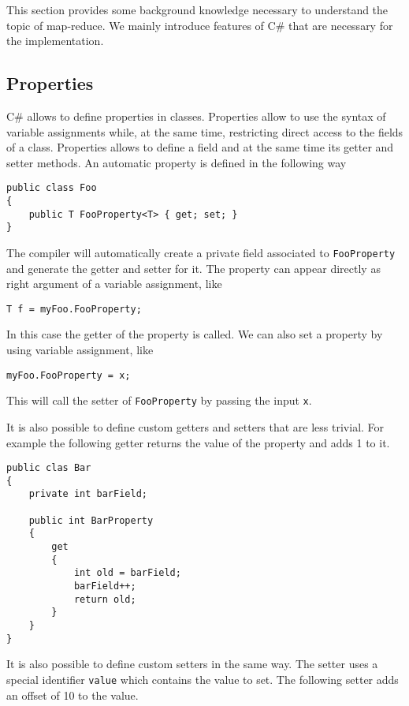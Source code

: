 This section provides some background knowledge necessary to understand the topic of map-reduce. We mainly introduce features of C\# that are necessary for the implementation.

\subsection{Properties}
C\# allows to define properties in classes. Properties allow to use the syntax of variable assignments while, at the same time, restricting direct access to the fields of a class. Properties allows to define a field and at the same time its getter and setter methods. An automatic property is defined in the following way

\begin{lstlisting}
public class Foo
{
	public T FooProperty<T> { get; set; }
}
\end{lstlisting}

\noindent
The compiler will automatically create a private field associated to \texttt{FooProperty} and generate the getter and setter for it. The property can appear directly as right argument of a variable assignment, like

\begin{lstlisting}
T f = myFoo.FooProperty;
\end{lstlisting}

\noindent
In this case the getter of the property is called. We can also set a property by using variable assignment, like

\begin{lstlisting}
myFoo.FooProperty = x;
\end{lstlisting}

\noindent
This will call the setter of \texttt{FooProperty} by passing the input \texttt{x}.

It is also possible to define custom getters and setters that are less trivial. For example the following getter returns the value of the property and adds 1 to it.

\begin{lstlisting}
public clas Bar
{
	private int barField;
	
	public int BarProperty
	{
		get
		{
			int old = barField;
			barField++;
			return old;
		}
	}
}
\end{lstlisting}

\noindent
It is also possible to define custom setters in the same way. The setter uses a special identifier \texttt{value} which contains the value to set. The following setter adds an offset of 10 to the value. 

